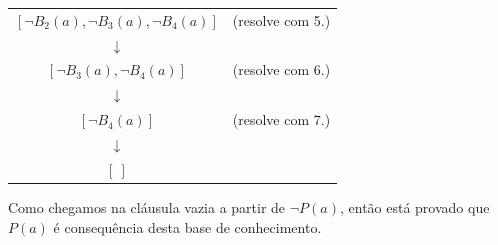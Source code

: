 \documentclass[12pt]{article}
\begin{document}
\begin{itemize}
\begin{itemize}
\begin{center}
\begin{tabular}{c c}
							$[\neg B_2(a), \neg B_3(a), \neg B_4(a)]$ & (resolve com 5.)\\
							$\downarrow$ & \\
							$[\neg B_3(a), \neg B_4(a)]$ & (resolve com 6.)\\
							$\downarrow$ & \\
							$[\neg B_4(a)]$ & (resolve com 7.)\\
							$\downarrow$ & \\
							$[ \ ]$ & \\
						\end{tabular}
					\end{center}
					\hfill\newline
					Como chegamos na cláusula vazia a partir de $\neg P(a)$, então está provado 
					que $P(a)$ é consequência desta base de conhecimento.
			\end{itemize}	
	\end{itemize}
\end{document}

